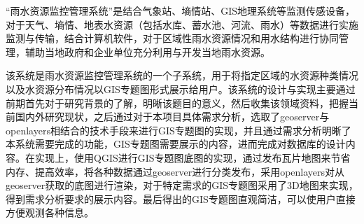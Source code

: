 “雨水资源监控管理系统”是结合气象站、墒情站、GIS地理系统等监测传感设备，对于天气、墒情、地表水资源（包括水库、蓄水池、河流、雨水）等数据进行实施监测与传输，结合计算机软件，对于区域性雨水资源情况和用水结构进行协同管理，辅助当地政府和企业单位充分利用与开发当地雨水资源。

该系统是雨水资源监控管理系统的一个子系统，用于将指定区域的水资源种类情况以及水资源分布情况以GIS专题图形式展示给用户。该系统的设计与实现主要通过前期首先对于研究背景的了解，明晰该题目的意义，然后收集该领域资料，把握当前国内外研究现状，之后通过对于本项目具体需求分析，选取了geoserver与openlayers相结合的技术手段来进行GIS专题图的实现，并且通过需求分析明晰了本系统需要完成的功能，GIS专题图需要展示的内容，进而完成对数据库的设计内容。在实现上，使用QGIS进行GIS专题图底图的实现，通过发布瓦片地图来节省内存、提高效率，将各种数据通过geoserver进行分类发布，采用openlayers对从geoserver获取的底图进行渲染，对于特定需求的GIS专题图采用了3D地图来实现，得到需求分析要求的展示内容。最后得出的GIS专题图直观简洁，可以使用户直接方便观测各种信息。

